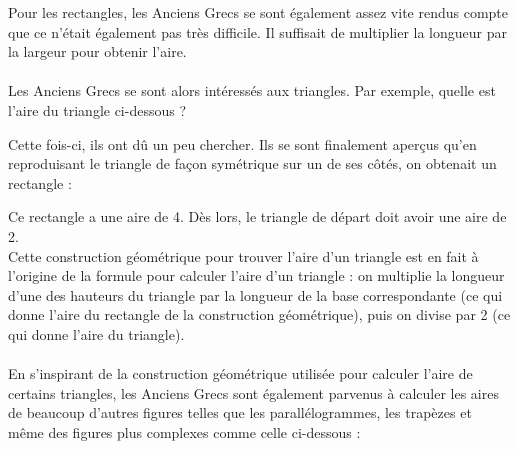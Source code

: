 \documentclass[a4paper,fontsize=13pt]{scrreprt}
\theoremstyle{plain}
\theoremstyle{definition}
\newcommand {\axes} {
	\draw[thick, ->] (\xmin,0) -- (\xmax+1,0);
	\draw[thick, ->] (0,\ymin) -- (0,\ymax+1);
	\draw (0,\ymax+0.5) node [left] {$y$};
	\draw (\xmax+0.5, 0) node [below] {$x$};
	\draw[thick] (-0.15,1)--(0.15,1) (1,-0.15)--(1,0.15);
	\draw (0,1)node[left]{$1$} (1,0)node[below]{$1$};
}
\begin{document}
Pour les rectangles, les Anciens Grecs se sont également assez vite rendus compte que ce n'était également pas très difficile. Il suffisait de multiplier la longueur par la largeur pour obtenir l'aire. \\
~\\
Les Anciens Grecs se sont alors intéressés aux triangles. Par exemple, quelle est l'aire du triangle ci-dessous ?
\begin{center}
\end{center}
\newpage
Cette fois-ci, ils ont dû un peu chercher. Ils se sont finalement aperçus qu'en reproduisant le triangle de façon symétrique sur un de ses côtés, on obtenait un rectangle :
\begin{center}
\end{center}
Ce rectangle a une aire de 4. Dès lors, le triangle de départ doit avoir une aire de 2. \\
Cette construction géométrique pour trouver l'aire d'un triangle est en fait à l'origine de la formule pour calculer l'aire d'un triangle : on multiplie la longueur d'une des hauteurs du triangle par la longueur de la base correspondante (ce qui donne l'aire du rectangle de la construction géométrique), puis on divise par 2 (ce qui donne l'aire du triangle). \\
~\\
En s'inspirant de la construction géométrique utilisée pour calculer l'aire de certains triangles, les Anciens Grecs sont également parvenus à calculer les aires de beaucoup d'autres figures telles que les parallélogrammes, les trapèzes et même des figures plus complexes comme celle ci-dessous :\begin{center}
\end{center}
\end{document}
